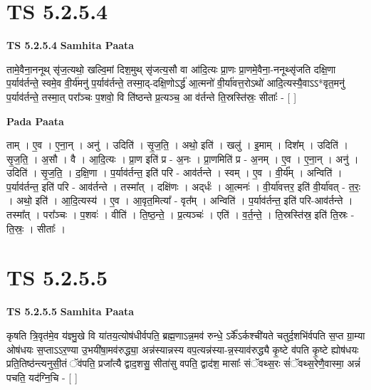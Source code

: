 \documentclass[17pt]{extarticle}
\begin{document}

\section{ TS 5.2.5.4 }

\textbf{TS 5.2.5.4 } \newline
\textbf{Samhita Paata} \newline

तामे॒वैना॒ननूथ् सृ॑ज॒त्यथो॒ खल्वि॒मां दिश॒मुथ् सृ॑जत्य॒सौ वा आ॑दि॒त्यः प्रा॒णः प्रा॒णमे॒वैना॒-ननूथ्सृ॑जति दक्षि॒णा प॒र्याव॑र्तन्ते॒ स्वमे॒व वी॒र्य॑मनु॑ प॒र्याव॑र्तन्ते॒ तस्मा॒द्-दक्षि॒णोऽर्द्ध॑ आ॒त्मनो॑ वी॒र्या॑वत्त॒रोऽथो॑ आदि॒त्यस्यै॒वाऽऽ*वृत॒मनु॑ प॒र्याव॑र्तन्ते॒ तस्मा॒त् परा᳚ञ्चः प॒शवो॒ वि ति॑ष्ठन्ते प्र॒त्यञ्च॒ आ व॑र्तन्ते ति॒स्रस्ति॑स्रः॒ सीताः᳚ - [  ] \newline

\textbf{Pada Paata} \newline

ताम् । ए॒व । ए॒ना॒न् । अनु॑ । उदिति॑ । सृ॒ज॒ति॒ । अथो॒ इति॑ । खलु॑ । इ॒माम् । दिश᳚म् । उदिति॑ । सृ॒ज॒ति॒ । अ॒सौ । वै । आ॒दि॒त्यः । प्रा॒ण इति॑ प्र - अ॒नः । प्रा॒णमिति॑ प्र - अ॒नम् । ए॒व । ए॒ना॒न् । अनु॑ । उदिति॑ । सृ॒ज॒ति॒ । द॒क्षि॒णा । प॒र्याव॑र्तन्त॒ इति॑ परि - आव॑र्तन्ते । स्वम् । ए॒व । वी॒र्य᳚म् । अन्विति॑ । प॒र्याव॑र्तन्त॒ इति॑ परि - आव॑र्तन्ते । तस्मा᳚त् । दक्षि॑णः । अद्‌र्धः॑ । आ॒त्मनः॑ । वी॒र्या॑वत्तर॒ इति॑ वी॒र्या॑वत् - त॒रः॒ । अथो॒ इति॑ । आ॒दि॒त्यस्य॑ । ए॒व । आ॒वृत॒मित्या᳚ - वृत᳚म् । अन्विति॑ । प॒र्याव॑र्तन्त॒ इति॑ परि-आव॑र्तन्ते । तस्मा᳚त् । परा᳚ञ्चः । प॒शवः॑ । वीति॑ । ति॒ष्ठ॒न्ते॒ । प्र॒त्यञ्चः॑ । एति॑ । व॒र्त॒न्ते॒ । ति॒स्रस्ति॑स्र॒ इति॑ ति॒स्रः - ति॒स्रः॒ । सीताः᳚ ।  \newline





\section{ TS 5.2.5.5 }

\textbf{TS 5.2.5.5 } \newline
\textbf{Samhita Paata} \newline

कृषति त्रि॒वृत॑मे॒व य॑ज्ञ्मु॒खे वि या॑तय॒त्योष॑धीर्वपति॒ ब्रह्म॒णाऽन्न॒मव॑ रुन्धे॒ ऽर्के᳚ऽर्कश्ची॑यते चतुर्द॒शभि॑र्वपति स॒प्त ग्रा॒म्या ओष॑धयः स॒प्ताऽऽर॒ण्या उ॒भयी॑षा॒मव॑रुद्ध्या॒ अन्न॑स्यान्नस्य वप॒त्यन्न॑स्या-न्न॒स्याव॑रुद्ध्यै कृ॒ष्टे व॑पति कृ॒ष्टे ह्योष॑धयः प्रति॒तिष्ठ॑न्त्यनुसी॒तं ॅव॑पति॒ प्रजा᳚त्यै द्वाद॒शसु॒ सीता॑सु वपति॒ द्वाद॑श॒ मासाः᳚ संॅवथ्स॒रः सं॑ॅवथ्स॒रेणै॒वास्मा॒ अन्नं॑ पचति॒ यद॑ग्नि॒चि - [  ] \newline
\end{document}
